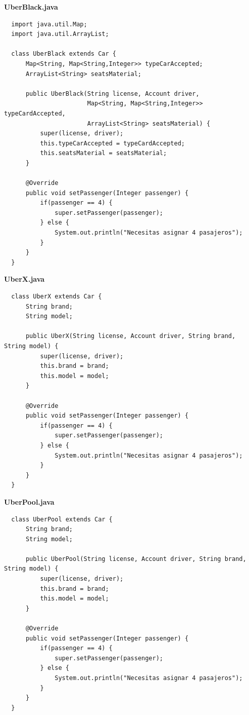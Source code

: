 \documentclass{article}
\begin{document}
\textbf{UberBlack.java}
\begin{verbatim}
  import java.util.Map;
  import java.util.ArrayList;

  class UberBlack extends Car {
      Map<String, Map<String,Integer>> typeCarAccepted;
      ArrayList<String> seatsMaterial;

      public UberBlack(String license, Account driver,
                       Map<String, Map<String,Integer>> typeCardAccepted,
                       ArrayList<String> seatsMaterial) {
          super(license, driver);
          this.typeCarAccepted = typeCardAccepted;
          this.seatsMaterial = seatsMaterial;
      }

      @Override
      public void setPassenger(Integer passenger) {
          if(passenger == 4) {
              super.setPassenger(passenger);
          } else {
              System.out.println("Necesitas asignar 4 pasajeros");
          }
      }
  }
\end{verbatim}

\textbf{UberX.java}
\begin{verbatim}
  class UberX extends Car {
      String brand;
      String model;

      public UberX(String license, Account driver, String brand, String model) {
          super(license, driver);
          this.brand = brand;
          this.model = model;
      }

      @Override
      public void setPassenger(Integer passenger) {
          if(passenger == 4) {
              super.setPassenger(passenger);
          } else {
              System.out.println("Necesitas asignar 4 pasajeros");
          }
      }
  }
\end{verbatim}

\textbf{UberPool.java}
\begin{verbatim}
  class UberPool extends Car {
      String brand;
      String model;

      public UberPool(String license, Account driver, String brand, String model) {
          super(license, driver);
          this.brand = brand;
          this.model = model;
      }

      @Override
      public void setPassenger(Integer passenger) {
          if(passenger == 4) {
              super.setPassenger(passenger);
          } else {
              System.out.println("Necesitas asignar 4 pasajeros");
          }
      }
  }
\end{verbatim}
\end{document}
